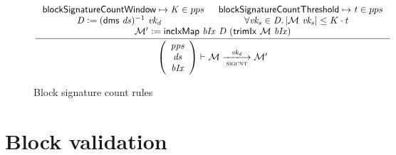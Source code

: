 \documentclass[11pt,a4paper]{article}
\newcommand{\var}[1]{\mathit{#1}}
\newcommand{\fun}[1]{\mathsf{#1}}
\newcommand{\type}[1]{\mathsf{#1}}
\newcommand{\pp}[1]{\mathsf{#1}}
\newcommand{\size}[1]{\left| #1 \right|}
\newcommand{\trans}[2]{\xlongrightarrow[\textsc{#1}]{#2}}
\newcommand{\leteq}{\ensuremath{\mathrel{\mathop:}=}}
\newcommand{\partialf}{\mapsto}
\newcommand{\signmapname}{\mathcal{M}}
\newcommand{\trimixname}{trimIx}
\newcommand{\incixmapname}{incIxMap}
\newcommand{\signmap}[1]{\fun{\signmapname} ~ #1}
\newcommand{\trimix}[2]{\fun{\trimixname} ~ #1 ~ #2}
\newcommand{\incixmap}[3]{\fun{\incixmapname} ~ #1 ~ #2 ~ #3}
\begin{document}
\begin{figure}[ht]
  \begin{equation*}
    \inference
    {
      \pp{blockSignatureCountWindow} \partialf \var{K} \in pps & \pp{blockSignatureCountThreshold} \partialf \var{t} \in pps \\
      \var{D} \leteq (\fun{dms} ~ \var{ds})^{-1} ~ \var{vk_d} & \forall \var{vk_s} \in \var{D} . \size{\signmap{\var{vk_s}}} \leq K \cdot t \\
      \signmapname' \leteq \incixmap{\var{bIx}}{\var{D}}{(\trimix{\signmapname}{\var{bIx}})}
    }
    {
      \left(
        {\begin{array}{c}
          \var{pps} \\
          \var{ds} \\
          \var{bIx}
        \end{array}}
      \right)
      \vdash
        {\signmapname}
      \trans{sigcnt}{\var{vk_d}}
        {\signmapname'}
    }
    \label{eq:rule:sigcnt}
  \end{equation*}
  \caption{Block signature count rules}
  \label{fig:rules:sigcnt}
\end{figure}

\clearpage

\section{Block validation}
\label{sec:block-validation}

\newcommand{\BHEnv}{\type{BHEnv}}
\newcommand{\BHState}{\type{BHState}}

\newcommand{\BBEnv}{\type{BBEnv}}
\newcommand{\BBState}{\type{BBState}}

\newcommand{\Bhead}{\type{BlockHeader}}
\newcommand{\Bbody}{\type{BlockBody}}
\newcommand{\Bhtosign}{\type{BHToSign}}

\newcommand{\bheadname}{bHead}
\newcommand{\bhead}[1]{\fun{\bheadname}\ #1}
\newcommand{\bbodyname}{bBody}
\newcommand{\bbody}[1]{\fun{\bbodyname}\ #1}
\newcommand{\bhhashname}{bhHash}
\newcommand{\bhhash}[1]{\fun{\bhhashname}\ #1}
\newcommand{\bhprevhashname}{bhPrevHash}
\newcommand{\bhprevhash}[1]{\fun{\bhprevhashname}\ #1}
\newcommand{\bhtosignname}{bhToSign}
\newcommand{\bhtosign}[1]{\fun{\bhtosignname}\ #1}
\newcommand{\bhslotname}{bhSlot}
\newcommand{\bhslot}[1]{\fun{\bhslotname}\ #1}

\newcommand{\maxblocksize}{\pp{maxBlockSize}}
\newcommand{\maxheadersize}{\pp{maxHeaderSize}}
\end{document}
